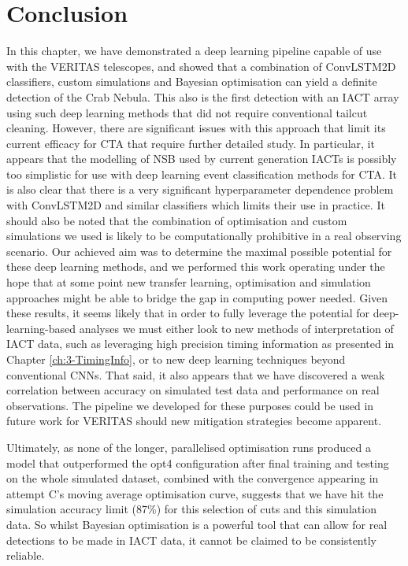 \section{Conclusion}
In this chapter, we have demonstrated a deep learning pipeline capable of use with the VERITAS telescopes, and showed that a combination of ConvLSTM2D classifiers, custom simulations and Bayesian optimisation can yield a definite detection of the Crab Nebula. This also is the first detection with an IACT array using such deep learning methods that did not require conventional tailcut cleaning. However, there are significant issues with this approach that limit its current efficacy for CTA that require further detailed study. In particular, it appears that the modelling of NSB used by current generation IACTs is possibly too simplistic for use with deep learning event classification methods for CTA. It is also clear that there is a very significant hyperparameter dependence problem with ConvLSTM2D and similar classifiers which limits their use in practice. It should also be noted that the combination of optimisation and custom simulations we used is likely to be computationally prohibitive in a real observing scenario. Our achieved aim was to determine the maximal possible potential for these deep learning methods, and we performed this work operating under the hope that at some point new transfer learning, optimisation and simulation approaches might be able to bridge the gap in computing power needed. Given these results, it seems likely that in order to fully leverage the potential for deep-learning-based analyses we must either look to new methods of interpretation of IACT data, such as leveraging high precision timing information as presented in Chapter \ref{ch:3-TimingInfo}, or to new deep learning techniques beyond conventional CNNs. That said, it also appears that we have discovered a weak correlation between accuracy on simulated test data and performance on real observations. The pipeline we developed for these purposes could be used in future work for VERITAS should new mitigation strategies become apparent.

Ultimately, as none of the longer, parallelised optimisation runs produced a model that outperformed the opt4 configuration after final training and testing on the whole simulated dataset, combined with the convergence appearing in attempt C's moving average optimisation curve, suggests that we have hit the simulation accuracy limit (87\%) for this selection of cuts and this simulation data. So whilst Bayesian optimisation is a powerful tool that can allow for real detections to be made in IACT data, it cannot be claimed to be consistently reliable.